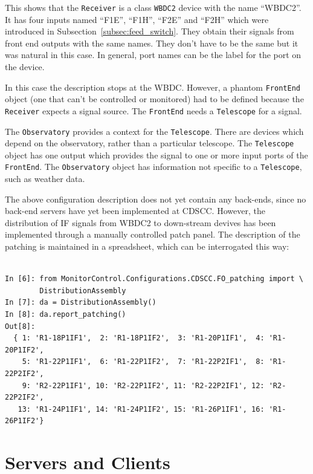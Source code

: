 \documentclass[letterpaper,11pt]{book}
\begin{document}
This shows that the {\tt Receiver} is a class {\tt WBDC2} device with the name
``WBDC2''.  It has four inputs named ``F1E'', ``F1H'', ``F2E'' and
``F2H'' which were introduced in Subsection~\ref{subsec:feed_switch}. They
obtain their signals from front end outputs with the same names.  They
don't have to be the same but it was natural in this case.  In general, port
names can be the label for the port on the device.

In this case the description stops at the WBDC.  However, a phantom 
{\tt FrontEnd} object (one that can't be controlled or monitored) had to be 
defined because the {\tt Receiver} expects a signal source.  The 
{\tt FrontEnd} needs a {\tt Telescope} for a signal.

The {\tt Observatory} provides a context for the {\tt Telescope}.  There are
devices which depend on the observatory, rather than a particular telescope.
The {\tt Telescope} object has one output which provides the signal to one or
more input ports of the {\tt FrontEnd}.  The {\tt Observatory} object has
information not specific to a {\tt Telescope}, such as weather data.

The above configuration description does not yet contain any back-ends, since
no back-end servers have yet been implemented at CDSCC.  However, the
distribution of IF signals from WBDC2 to down-stream devives has been
implemented through a manually controlled patch panel.  The description of the
patching is maintained in a spreadsheet, which can be interrogated this way:
\begin{code}[h!tb]
  \begin{center}
  \begin{verbatim}
  
In [6]: from MonitorControl.Configurations.CDSCC.FO_patching import \
        DistributionAssembly
In [7]: da = DistributionAssembly()
In [8]: da.report_patching()
Out[8]:
  { 1: 'R1-18P1IF1',  2: 'R1-18P1IF2',  3: 'R1-20P1IF1',  4: 'R1-20P1IF2',
    5: 'R1-22P1IF1',  6: 'R1-22P1IF2',  7: 'R1-22P2IF1',  8: 'R1-22P2IF2',
    9: 'R2-22P1IF1', 10: 'R2-22P1IF2', 11: 'R2-22P2IF1', 12: 'R2-22P2IF2',
   13: 'R1-24P1IF1', 14: 'R1-24P1IF2', 15: 'R1-26P1IF1', 16: 'R1-26P1IF2'}
\end{verbatim}
\end{center}
\end{code}

\chapter{Servers and Clients}
\end{document}
